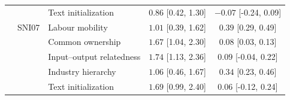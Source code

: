\begin{table}[htbp]
\begin{tabular}{lllcc}
 &  & Text initialization & $0.86$ [0.42, 1.30] & $-0.07$ [-0.24, 0.09] \\
\addlinespace[2pt]
 & SNI07 & Labour mobility & $1.01$ [0.39, 1.62] & $0.39$ [0.29, 0.49] \\
 &  & Common ownership & $1.67$ [1.04, 2.30] & $0.08$ [0.03, 0.13] \\
 &  & Input--output relatedness & $1.74$ [1.13, 2.36] & $0.09$ [-0.04, 0.22] \\
 &  & Industry hierarchy & $1.06$ [0.46, 1.67] & $0.34$ [0.23, 0.46] \\
 &  & Text initialization & $1.69$ [0.99, 2.40] & $0.06$ [-0.12, 0.24] \\
\bottomrule
\end{tabular}
\end{table}
